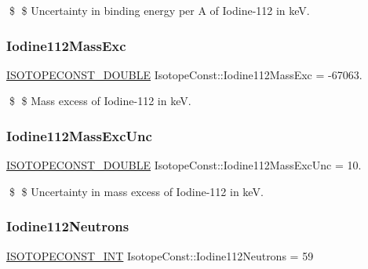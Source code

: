 \$ \$ Uncertainty in binding energy per A of Iodine-\/112 in keV. \mbox{\label{group___isotope_const-_iodine-_i112_gaa9354f5506484a9227550d4e7144ec10}} 
\subsubsection{\texorpdfstring{Iodine112\+Mass\+Exc}{Iodine112MassExc}}
{\footnotesize\ttfamily \mbox{\hyperlink{group___isotope_const-_macros_ga8f45a7272ce02c0b4c65c44636ed719a}{I\+S\+O\+T\+O\+P\+E\+C\+O\+N\+S\+T\+\_\+\+D\+O\+U\+B\+LE}} Isotope\+Const\+::\+Iodine112\+Mass\+Exc = -\/67063.}

\$ \$ Mass excess of Iodine-\/112 in keV. \mbox{\label{group___isotope_const-_iodine-_i112_gac9524484cb8515b4f80acface47ac141}} 
\subsubsection{\texorpdfstring{Iodine112\+Mass\+Exc\+Unc}{Iodine112MassExcUnc}}
{\footnotesize\ttfamily \mbox{\hyperlink{group___isotope_const-_macros_ga8f45a7272ce02c0b4c65c44636ed719a}{I\+S\+O\+T\+O\+P\+E\+C\+O\+N\+S\+T\+\_\+\+D\+O\+U\+B\+LE}} Isotope\+Const\+::\+Iodine112\+Mass\+Exc\+Unc = 10.}

\$ \$ Uncertainty in mass excess of Iodine-\/112 in keV. \mbox{\label{group___isotope_const-_iodine-_i112_gaad30176fa0b08690bf40109e71dc1ddc}} 
\subsubsection{\texorpdfstring{Iodine112\+Neutrons}{Iodine112Neutrons}}
{\footnotesize\ttfamily \mbox{\hyperlink{group___isotope_const-_macros_ga5f18360b3e99483a35c32d789e62621c}{I\+S\+O\+T\+O\+P\+E\+C\+O\+N\+S\+T\+\_\+\+I\+NT}} Isotope\+Const\+::\+Iodine112\+Neutrons = 59}

